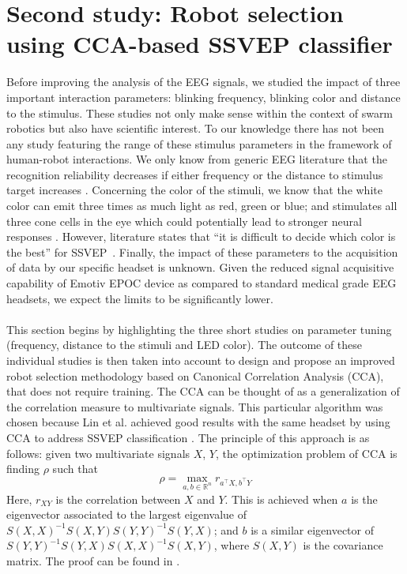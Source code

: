 \documentclass[smallextended]{svjour3}
\begin{document}
\section{Second study: Robot selection using CCA-based SSVEP classifier}
\label{sec:CCA_approach}
Before improving the analysis of the EEG signals, we studied the impact of three important interaction parameters: blinking frequency, blinking color and distance to the stimulus. These studies not only make sense within the context of swarm robotics but also have scientific interest. To our knowledge there has not been any study featuring the range of these stimulus parameters in the framework of human-robot interactions. We only know from generic EEG literature that the recognition reliability decreases if either frequency or the distance to stimulus target increases \cite{herrmann2001,wu2013effect}. Concerning the color of the stimuli, we know that the white color can emit three times as much light as red, green or blue; and stimulates all three cone cells in the eye which could potentially lead to stronger neural responses \cite{aljshamee2016discriminate,cao2012flashing}. However, literature states that ``it is difficult to decide which color is the best'' for SSVEP~\cite{Zhu2010}.
Finally, the impact of these parameters to the acquisition of data by our specific headset is unknown. Given the reduced signal acquisitive capability of Emotiv EPOC device as compared to standard medical grade EEG headsets, we expect the limits to be significantly lower.\\
\\
This section begins by highlighting the three short studies on parameter tuning (frequency, distance to the stimuli and LED color). The outcome of these individual studies is then taken into account to design and propose an improved robot selection methodology based on Canonical Correlation Analysis (CCA), that does not require training. 
The CCA can be thought of as a generalization of the correlation measure to multivariate signals. 
This particular algorithm was chosen because Lin et al. achieved good results with the same headset by using CCA to address SSVEP classification \cite{Lin2014}. The principle of this approach is as follows: given two multivariate signals $X$, $Y$, the optimization problem of CCA is finding $\rho$ such that
\\
\begin{equation}
\label{rho}
\rho = \max_{a, b \in \mathbb R^n} r_{ a^\top X, b^\top Y}
\end{equation}
Here, $r_{XY}$ is the correlation between $X$ and $Y$. This is achieved when $a$ is the eigenvector associated to the largest eigenvalue of $S(X, X)^{-1} S(X,Y) S(Y, Y)^{-1} S(Y, X)$; and $b$ is a similar eigenvector of $S(Y, Y)^{-1} S(Y, X) S(X, X)^{-1} S(X, Y)$, where $S(X, Y)$ is the covariance matrix. The proof can be found in \cite{rencher2003}.
\end{document}

